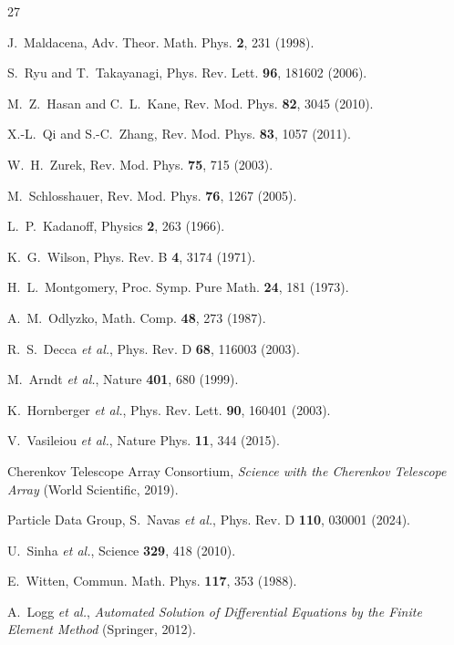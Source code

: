 \documentclass[prd,twocolumn,amsmath,amssymb]{revtex4-2}
\begin{document}
\begin{thebibliography}{27}

J.~Maldacena, Adv. Theor. Math. Phys. \textbf{2}, 231 (1998).

S.~Ryu and T.~Takayanagi, Phys. Rev. Lett. \textbf{96}, 181602 (2006).

M.~Z.~Hasan and C.~L.~Kane, Rev. Mod. Phys. \textbf{82}, 3045 (2010).

X.-L.~Qi and S.-C.~Zhang, Rev. Mod. Phys. \textbf{83}, 1057 (2011).

W.~H.~Zurek, Rev. Mod. Phys. \textbf{75}, 715 (2003).

M.~Schlosshauer, Rev. Mod. Phys. \textbf{76}, 1267 (2005).

L.~P.~Kadanoff, Physics \textbf{2}, 263 (1966).

K.~G.~Wilson, Phys. Rev. B \textbf{4}, 3174 (1971).

H.~L.~Montgomery, Proc. Symp. Pure Math. \textbf{24}, 181 (1973).

A.~M.~Odlyzko, Math. Comp. \textbf{48}, 273 (1987).

R.~S.~Decca \textit{et al.}, Phys. Rev. D \textbf{68}, 116003 (2003).

M.~Arndt \textit{et al.}, Nature \textbf{401}, 680 (1999).

K.~Hornberger \textit{et al.}, Phys. Rev. Lett. \textbf{90}, 160401 (2003).

V.~Vasileiou \textit{et al.}, Nature Phys. \textbf{11}, 344 (2015).

Cherenkov Telescope Array Consortium, \textit{Science with the Cherenkov Telescope Array} (World Scientific, 2019).

Particle Data Group, S.~Navas \textit{et al.}, Phys. Rev. D \textbf{110}, 030001 (2024).

U.~Sinha \textit{et al.}, Science \textbf{329}, 418 (2010).

E.~Witten, Commun. Math. Phys. \textbf{117}, 353 (1988).

A.~Logg \textit{et al.}, \textit{Automated Solution of Differential Equations by the Finite Element Method} (Springer, 2012).


\end{thebibliography}
\end{document}
